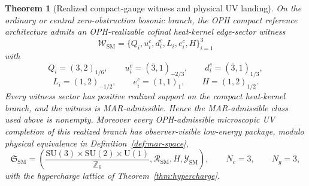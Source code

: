 \documentclass[11pt]{article}
\newtheorem{theorem}{Theorem}[section]
\newcommand{\SU}{\mathrm{SU}}
\newcommand{\U}{\mathrm{U}}
\begin{document}
\begin{theorem}[Realized compact-gauge witness and physical UV landing]\label{thm:mar-witness-landing}
On the ordinary or central zero-obstruction bosonic branch, the OPH compact reference architecture admits an OPH-realizable cofinal heat-kernel edge-sector witness
\[
\mathcal W_{\mathrm{SM}}
=
\{Q_i,u_i^c,d_i^c,L_i,e_i^c,H\}_{i=1}^{3}
\]
with
\[
Q_i=(3,2)_{1/6},\qquad
u_i^c=(\bar 3,1)_{-2/3},\qquad
d_i^c=(\bar 3,1)_{1/3},
\]
\[
L_i=(1,2)_{-1/2},\qquad
e_i^c=(1,1)_1,\qquad
H=(1,2)_{1/2}.
\]
Every witness sector has positive realized support on the compact heat-kernel branch, and the witness is MAR-admissible. Hence the MAR-admissible class used above is nonempty. Moreover every OPH-admissible microscopic UV completion of this realized branch has observer-visible low-energy package, modulo physical equivalence in Definition~\ref{def:mar-space},
\[
\mathfrak S_{\mathrm{SM}}
=
\left(
\frac{\SU(3)\times\SU(2)\times\U(1)}{\mathbb Z_6},
\mathcal R_{\mathrm{SM}},
H,
\mathcal Y_{\mathrm{SM}}
\right),
\qquad
N_c=3,\qquad N_g=3,
\]
with the hypercharge lattice of Theorem~\ref{thm:hypercharge}.
\end{theorem}
\end{document}
